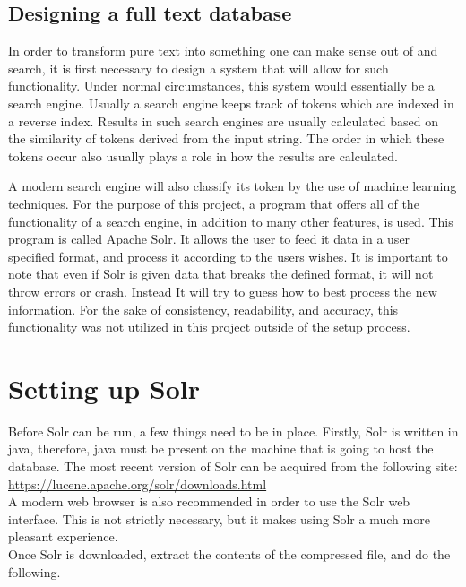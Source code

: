 \documentclass[a4paper,english]{report}
\begin{document}
  \subsection{Designing a full text database}
In order to transform pure text into something one can make sense out of and search, it is first necessary to design a system that will allow for such functionality. Under normal circumstances, this system would essentially be a search engine. Usually a search engine keeps track of  tokens which are indexed in a reverse index. Results in such search engines are usually calculated based on the similarity of tokens derived from the input string. The order in which these tokens occur also usually plays a role in how the results are calculated.

A modern search engine will also classify its token by the use of machine learning techniques.
For the purpose of this project, a program that offers all of the functionality of a search engine, in addition to many other features, is used. This program is called Apache Solr. It allows the user to feed it data in a user specified format, and process it according to the users wishes. It is important to note that even if Solr is given data that  breaks the defined format, it will not throw errors or crash. Instead It will try to guess how to best process the new information. For the sake of consistency, readability, and accuracy, this functionality was not utilized in this project outside of the setup process. 


\section{Setting up Solr}

Before Solr can be run, a few things need to be in place. Firstly, Solr is written in java, therefore, java must be present on the machine that is going to host the database.
The most recent version of Solr can be acquired from the following site:\\

\url{https://lucene.apache.org/solr/downloads.html}\\

A modern web browser is also recommended in order to use the Solr web interface. This is not strictly necessary, but it makes using Solr a much more pleasant experience. \\

Once Solr is downloaded, extract the contents of the compressed file, and do the following.
\end{document}
